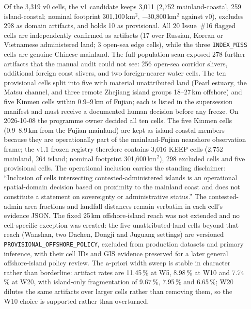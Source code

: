Of the 3{,}319 v0 cells, the v1 candidate keeps 3{,}011 (2{,}752
mainland-coastal, 259 island-coastal; nominal footprint
301{,}100\,km$^2$, $-$30{,}800\,km$^2$ against v0), excludes 298 as
domain artifacts, and holds 10 as provisional. All 20 Issue~\#16
flagged cells are independently confirmed as artifacts (17 over
Russian, Korean or Vietnamese administered land; 3 open-sea edge
cells), while the three \texttt{INDEX\_MISS} cells are genuine Chinese
mainland. The full-population scan exposed 278 further artifacts that
the manual audit could not see: 256 open-sea corridor slivers,
additional foreign coast slivers, and two foreign-nearer water cells.
The ten provisional cells split into five with material unattributed
land (Pearl estuary, the Matsu channel, and three remote Zhejiang
island groups 18--27\,km offshore) and five Kinmen cells within
0.9--9\,km of Fujian; each is listed in the supersession manifest and
must receive a documented human decision before any freeze.
On 2026-10-08 the programme owner decided all ten cells. The five Kinmen
cells (0.9--8.9\,km from the Fujian mainland) are kept as island-coastal
members because they are operationally part of the mainland-Fujian
nearshore observation frame; the v1.1 frozen registry therefore contains
3{,}016 KEEP cells (2{,}752 mainland, 264 island; nominal footprint
301{,}600\,km$^2$), 298 excluded cells and five provisional cells. The
operational inclusion carries the standing disclaimer: ``Inclusion of
cells intersecting contested-administered islands is an operational
spatial-domain decision based on proximity to the mainland coast and does
not constitute a statement on sovereignty or administrative status.'' The
contested-admin area fractions and landfall distances remain verbatim in
each cell's evidence JSON. The fixed 25\,km offshore-island reach was not
extended and no cell-specific exception was created: the five
unattributed-land cells beyond that reach (Wanshan, two Dachen, Dongji and
Juguang settings) are versioned \texttt{PROVISIONAL\_OFFSHORE\_POLICY},
excluded from production datasets and primary inference, with their cell
IDs and GIS evidence preserved for a later general offshore-island policy
review. The
a-priori width sweep is stable in character rather than borderline:
artifact rates are 11.45\,\% at W5, 8.98\,\% at W10 and 7.74\,\% at W20,
with island-only fragmentation of 9.67\,\%, 7.95\,\% and 6.65\,\%; W20
dilutes the same artifacts over larger cells rather than removing them,
so the W10 choice is supported rather than overturned.

